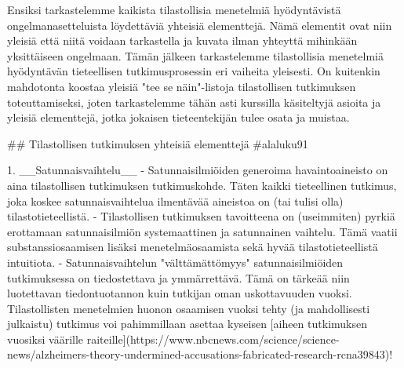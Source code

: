 \documentclass[
]{book}
\begin{document}
\begin{itemize}
Ensiksi tarkastelemme kaikista tilastollisia menetelmiä hyödyntävistä ongelmanasetteluista löydettäviä yhteisiä elementtejä. Nämä elementit ovat niin yleisiä että niitä voidaan tarkastella ja kuvata ilman yhteyttä mihinkään yksittäiseen ongelmaan. Tämän jälkeen tarkastelemme tilastollisia menetelmiä hyödyntävän tieteellisen tutkimusprosessin eri vaiheita yleisesti. On kuitenkin mahdotonta koostaa yleisiä "tee se näin"-listoja tilastollisen tutkimuksen toteuttamiseksi, joten tarkastelemme tähän asti kurssilla käsiteltyjä asioita ja yleisiä elementtejä, jotka jokaisen tieteentekijän tulee osata ja muistaa.    

## Tilastollisen tutkimuksen yhteisiä elementtejä {#alaluku91}


1. __Satunnaisvaihtelu__
  - Satunnaisilmiöiden generoima havaintoaineisto on aina tilastollisen tutkimuksen tutkimuskohde. Täten kaikki tieteellinen tutkimus, joka koskee satunnaisvaihtelua ilmentävää aineistoa on (tai tulisi olla) tilastotieteellistä.
  - Tilastollisen tutkimuksen tavoitteena on (useimmiten) pyrkiä erottamaan satunnaisilmiön systemaattinen ja satunnainen vaihtelu. Tämä vaatii substanssiosaamisen lisäksi menetelmäosaamista sekä hyvää tilastotieteellistä intuitiota.
  - Satunnaisvaihtelun "välttämättömyys" satunnaisilmiöiden tutkimuksessa on tiedostettava ja ymmärrettävä. Tämä on tärkeää niin luotettavan tiedontuotannon kuin tutkijan oman uskottavuuden vuoksi. Tilastollisten menetelmien huonon osaamisen vuoksi tehty (ja mahdollisesti julkaistu) tutkimus voi pahimmillaan asettaa kyseisen [aiheen tutkimuksen vuosiksi väärille raiteille](https://www.nbcnews.com/science/science-news/alzheimers-theory-undermined-accusations-fabricated-research-rcna39843)!


\end{itemize}
\end{document}
